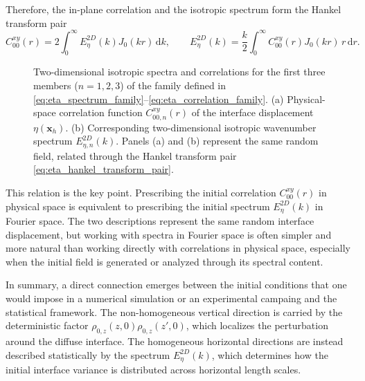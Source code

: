 Therefore, the in-plane correlation and the isotropic spectrum form the Hankel transform pair
\begin{equation}
    C_{00}^{xy}(r)
    =
    2
    \int_0^\infty
    E_{\eta}^{2D}(k)
    J_0(kr)\,
    \mathrm{d}k,
    \qquad
    E_{\eta}^{2D}(k)
    =
    \frac{k}{2}
    \int_0^\infty
    C_{00}^{xy}(r)
    J_0(kr)\,
    r\,\mathrm{d}r.
    \label{eq:eta_hankel_transform_pair}
\end{equation}
\begin{figure}
  \centering
  \begin{minipage}{0.48\textwidth}
    \centering
    
  \end{minipage}
  \hfill
  \begin{minipage}{0.48\textwidth}
    \centering
    
  \end{minipage}
  \caption{Two-dimensional isotropic spectra and correlations for the first three members
  (\(n=1,2,3\)) of the family defined in \eqref{eq:eta_spectrum_family}--\eqref{eq:eta_correlation_family}.
  (a) Physical-space correlation function \(C_{00,n}^{xy}(r)\) of the interface displacement
  \(\eta(\boldsymbol{x}_h)\). (b) Corresponding two-dimensional isotropic wavenumber spectrum
  \(E_{\eta,n}^{2D}(k)\). Panels (a) and (b) represent the same random field, related through
  the Hankel transform pair \eqref{eq:eta_hankel_transform_pair}.}
  \label{fig:eta_2d_family}
\end{figure}
This relation is the key point. Prescribing the initial correlation \(C_{00}^{xy}(r)\) in physical space is equivalent to prescribing the initial spectrum \(E_{\eta}^{2D}(k)\) in Fourier space. The two descriptions represent the same random interface displacement, but working with spectra in Fourier space is often simpler and more natural than working directly with correlations in physical space, especially when the initial field is generated or analyzed through its spectral content.

In summary, a direct connection emerges between the initial conditions that one would impose in a numerical simulation or an experimental campaing and the statistical framework. The non-homogeneous vertical direction is carried by the deterministic factor \(\rho_{0,z}(z,0)\rho_{0,z}(z',0)\), which localizes the perturbation around the diffuse interface. The homogeneous horizontal directions are instead described statistically by the spectrum \(E_{\eta}^{2D}(k)\), which determines how the initial interface variance is distributed across horizontal length scales.

